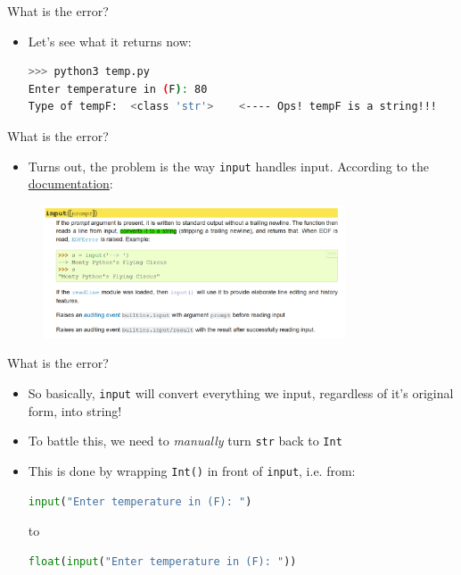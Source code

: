 \documentclass[10pt,xcolor={table,dvipsnames},t]{beamer}
\begin{document}
\begin{frame}[fragile]{What is the error?}
  \begin{itemize}
    \item Let's see what it returns now:
\begin{lstlisting}[language=bash]
>>> python3 temp.py
Enter temperature in (F): 80
Type of tempF:  <class 'str'>    <---- Ops! tempF is a string!!!
\end{lstlisting}
  \end{itemize}
\end{frame}

\begin{frame}[fragile]{What is the error?}
  \begin{itemize}
    \item Turns out, the problem is the way \texttt{input} handles input. According to the \href{https://docs.python.org/3/library/functions.html#input}{documentation}:
  \end{itemize}
  \begin{figure}
    \centering
    \includegraphics[width=0.8\textwidth]{img/python-docs.png}
  \end{figure}
\end{frame}

\begin{frame}[fragile]{What is the error?}
  \begin{itemize}
    \item So basically, \texttt{input} will convert everything we input, regardless of it's original form, into string!
    \item To battle this, we need to \textit{manually} turn \texttt{str} back to \texttt{Int}
    \item This is done by wrapping \texttt{Int()} in front of \texttt{input}, i.e. from:
\begin{lstlisting}[language=python]
input("Enter temperature in (F): ")
\end{lstlisting}
to
\begin{lstlisting}[language=python]
float(input("Enter temperature in (F): "))
\end{lstlisting}
  \end{itemize}
\end{frame}
\end{document}
